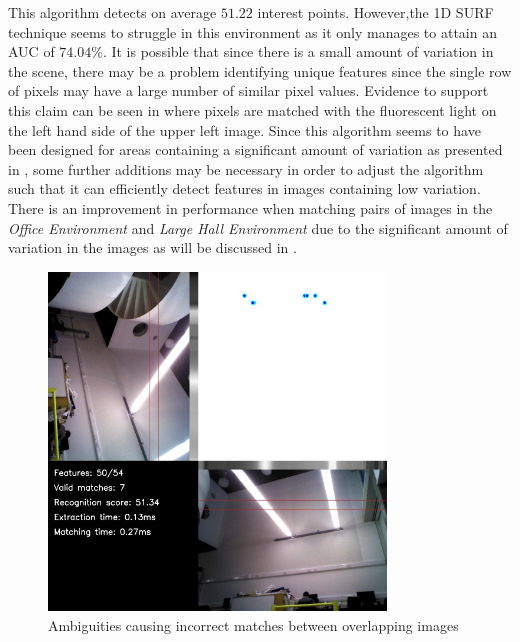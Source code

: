 \documentclass[11pt]{report}
\begin{document}
This algorithm detects on average $51.22$ interest points. However,the 1D SURF technique seems to struggle in this environment as it only manages to attain an AUC of $74.04\%$. It is possible that since there is a small amount of variation in the scene, there may be a problem identifying unique features since the single row of pixels may have a large number of similar pixel values. Evidence to support this claim can be seen in  where pixels are matched with the fluorescent light on the left hand side of the upper left image. Since this algorithm seems to have been designed for areas containing a significant amount of variation as presented in \citep{Anderson}, some further additions may be necessary in order to adjust the algorithm such that it can efficiently detect features in images containing low variation. There is an improvement in performance when matching pairs of images in the \textit{Office Environment} and \textit{Large Hall Environment} due to the significant amount of variation in the images as will be discussed in .\\

\begin{figure}
  \centering
    \includegraphics[width=0.8\textwidth]{../Drawings/Matching/nonmatching.jpg}
    \caption{Ambiguities causing incorrect matches between overlapping images} 
    \label{fig:ambiguities}
\end{figure}
\end{document}
